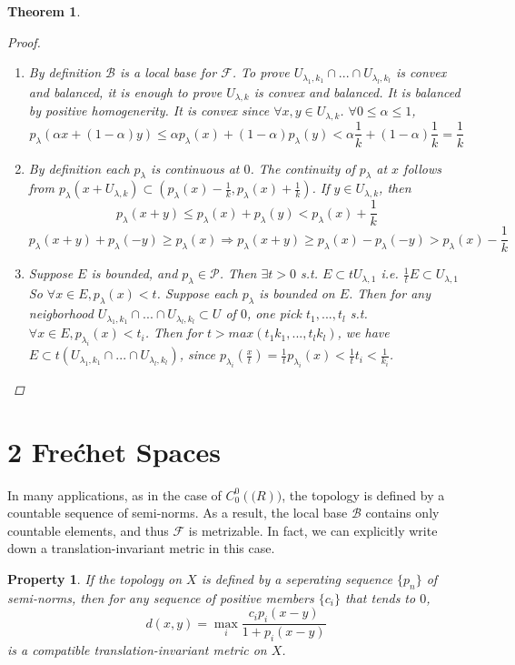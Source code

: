 \documentclass{article}
\newtheorem*{property}{Property}
\newtheorem*{theorem}{Theorem}
\begin{document}
\begin{theorem}
\begin{proof}
\begin{enumerate}
\begin{itemize}
            \end{itemize}
            \item By definition $\mathcal{B}$ is a local base for $\mathcal{F}$.
            To prove $U_{\lambda_1, k_1} \cap ... \cap U_{\lambda_l, k_l}$ is convex and balanced,
            it is enough to prove $U_{\lambda, k}$ is convex and balanced.
            It is balanced by positive homogenerity. It is convex since $\forall x, y \in U_{\lambda, k}$.
            $\forall 0 \le \alpha \le 1$,
            \[
                p_{\lambda}(\alpha x + (1 - \alpha)y) \le \alpha p_{\lambda}(x) + (1-\alpha)p_{\lambda}(y) < \alpha \frac{1}{k} + (1 - \alpha) \frac{1}{k} = \frac{1}{k}
            \]
            \item By definition each $p_{\lambda}$ is continuous at $0$.
            The continuity of $p_{\lambda}$ at $x$ follows from $p_{\lambda}(x + U_{\lambda, k}) \subset (p_{\lambda}(x) - \frac{1}{k}, p_{\lambda}(x) + \frac{1}{k})$.
            If $y \in U_{\lambda, k}$, then 
            \[p_{\lambda}(x + y) \le p_{\lambda}(x) + p_{\lambda}(y) < p_{\lambda}(x) + \frac{1}{k}\]
            \[p_{\lambda}(x + y) + p_{\lambda}(-y) \ge p_{\lambda}(x) \Rightarrow p_{\lambda}(x + y) \ge p_{\lambda}(x) - p_{\lambda}(-y) > p_{\lambda}(x) - \frac{1}{k}\]
            \item Suppose $E$ is bounded, and $p_{\lambda} \in \mathcal{P}$. Then $\exists t > 0$ s.t. $E \subset tU_{\lambda, 1}$ i.e. $\frac{1}{t}E \subset U_{\lambda, 1}$
            So $\forall x \in E, p_{\lambda}(x) < t$.
            Suppose each $p_{\lambda}$ is bounded on $E$. Then for any neigborhood $U_{\lambda_1, k_1} \cap ... \cap U_{\lambda_l, k_l} \subset U$ of $0$,
            one pick $t_1, ..., t_l$ s.t. $\forall x \in E, p_{\lambda_i}(x) < t_i$. 
            Then for $t > max(t_1 k_1, ..., t_l k_l)$, we have $E \subset t(U_{\lambda_1, k_1} \cap ... \cap U_{\lambda_l, k_l})$,
            since $p_{\lambda_i}(\frac{x}{t}) = \frac{1}{t} p_{\lambda_i}(x) < \frac{1}{t}t_i < \frac{1}{k_i}$.
        \end{enumerate}
    \end{proof}
\end{theorem}
\section*{2 Fre\'chet Spaces}
In many applications, as in the case of $C_0^0(\mathbb(R))$, the topology is defined by a countable sequence of semi-norms.
As a result, the local base $\mathcal{B}$ contains only countable elements, and thus $\mathcal{F}$ is metrizable. In fact,
we can explicitly write down a translation-invariant metric in this case.
\begin{property}
    If the topology on $X$ is defined by a seperating sequence $\{p_n\}$ of semi-norms,
    then for any sequence of positive members $\{c_i\}$ that tends to $0$,
    \[
        d(x, y) = \max_{i}\frac{c_i p_i (x-y)}{1 + p_i(x-y)}
    \]
    is a compatible translation-invariant metric on $X$.
\end{property}
\end{document}
